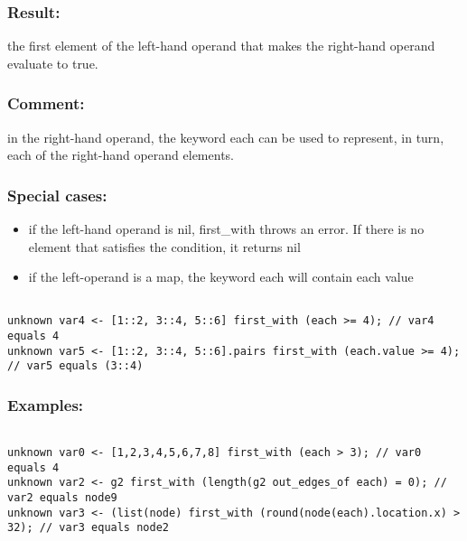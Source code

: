 \documentclass[]{book}
\providecommand{\tightlist}{%
  \setlength{\itemsep}{0pt}\setlength{\parskip}{0pt}}
\theoremstyle{definition}
\theoremstyle{definition}
\theoremstyle{definition}
\theoremstyle{remark}
\begin{document}
\subsubsection{Result:}\label{result-162}

the first element of the left-hand operand that makes the right-hand
operand evaluate to true.

\subsubsection{Comment:}\label{comment-38}

in the right-hand operand, the keyword each can be used to represent, in
turn, each of the right-hand operand elements.

\subsubsection{Special cases:}\label{special-cases-62}

\begin{itemize}
\tightlist
\item
  if the left-hand operand is nil, first\_with throws an error. If there
  is no element that satisfies the condition, it returns nil\\
\item
  if the left-operand is a map, the keyword each will contain each value
\end{itemize}

\begin{verbatim}
 
unknown var4 <- [1::2, 3::4, 5::6] first_with (each >= 4); // var4 equals 4 
unknown var5 <- [1::2, 3::4, 5::6].pairs first_with (each.value >= 4); // var5 equals (3::4)
\end{verbatim}

\subsubsection{Examples:}\label{examples-124}

\begin{verbatim}
 
unknown var0 <- [1,2,3,4,5,6,7,8] first_with (each > 3); // var0 equals 4 
unknown var2 <- g2 first_with (length(g2 out_edges_of each) = 0); // var2 equals node9 
unknown var3 <- (list(node) first_with (round(node(each).location.x) > 32); // var3 equals node2
\end{verbatim}
\end{document}
